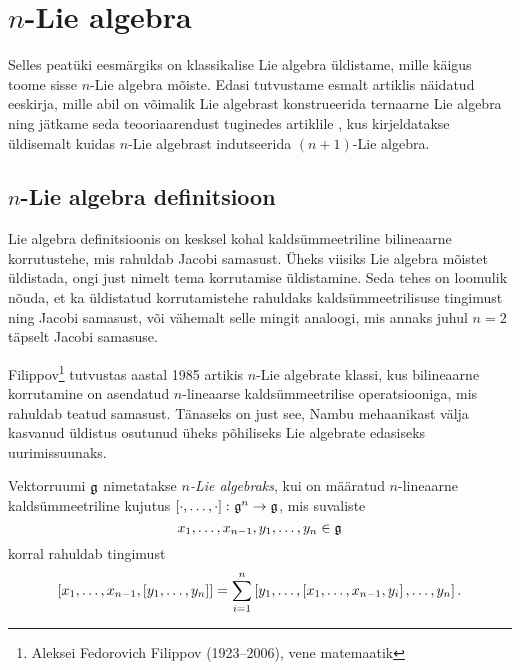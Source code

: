 

\section{\texorpdfstring{$n$}{n}-Lie algebra}

Selles peatüki eesmärgiks on klassikalise Lie algebra
üldistame, mille käigus toome sisse $n$-Lie algebra mõiste.
Edasi tutvustame esmalt artiklis \cite{AMS:2011} näidatud eeskirja,
mille abil on võimalik Lie algebrast konstrueerida
ternaarne Lie algebra ning jätkame seda teooriaarendust
tuginedes artiklile \cite{AKMS:2014}, kus kirjeldatakse
üldisemalt kuidas $n$-Lie algebrast indutseerida $(n+1)$-Lie
algebra.

\subsection{\texorpdfstring{$n$}{n}-Lie algebra definitsioon}

Lie algebra definitsioonis on kesksel kohal kaldsümmeetriline
bilineaarne korrutustehe, mis rahuldab Jacobi samasust.
Üheks viisiks Lie algebra mõistet üldistada, ongi just nimelt
tema korrutamise üldistamine. Seda tehes on loomulik nõuda, et
ka üldistatud korrutamistehe rahuldaks kaldsümmeetrilisuse
tingimust ning Jacobi samasust, või vähemalt selle mingit
analoogi, mis annaks juhul $n=2$ täpselt Jacobi samasuse.

Filippov\footnote{Aleksei Fedorovich Filippov (1923--2006),
vene matemaatik} tutvustas aastal 1985 artikis \cite{filippov1985}
$n$-Lie algebrate klassi, kus bilineaarne korrutamine on
asendatud $n$-lineaarse kaldsümmeetrilise operatsiooniga,
mis rahuldab teatud samasust. \cite{kasymov1987}
Tänaseks on just see, Nambu mehaanikast välja kasvanud
üldistus osutunud üheks põhiliseks Lie algebrate edasiseks
uurimissuunaks.

\begin{dfn}
    Vektorruumi $\mathfrak{g}$ nimetatakse \emph{$n$-Lie algebraks}, kui
    on määratud $n$-lineaarne kaldsümmeetriline kujutus
    $\left[ \cdot, \dots, \cdot \right] \colon \mathfrak{g}^n \to \mathfrak{g}$, mis
    suvaliste
    \[ x_1, \dots, x_{n-1}, y_1, \dots, y_n \in \mathfrak{g} \]
    korral rahuldab tingimust
    \begin{align}\label{id:filippov}
        \left[ x_1, \dots, x_{n-1}, \left[ y_1, \dots, y_n \right] \right] =
        \sum_{i=1}^n \left[
            y_1, \dots, \left[ x_1, \dots, x_{n-1}, y_i \right], \dots, y_n
        \right].
    \end{align}
\end{dfn}

